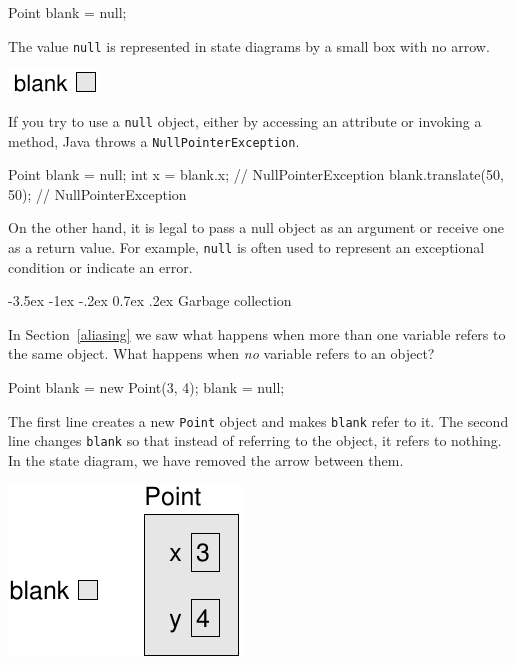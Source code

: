 \documentclass[12pt]{book}
\makeatletter
\theoremstyle{exercise}
\newcommand{\java}[1]{\verb"#1"}
\renewcommand{\section}{\@startsection{section}{1}{\z@}%
    {-3.5ex \@plus -1ex \@minus -.2ex}%
    {0.7ex \@plus.2ex}%
    {\normalfont\Large\bfseries}}
\newcommand{\java}[1]{\lstinline{#1}} %
\makeatother
\begin{document}
\begin{code}
    Point blank = null;
\end{code}

The value \java{null} is represented in state diagrams by a small box with no arrow.

\begin{center}
\includegraphics{figs/reference2.pdf}
\end{center}


If you try to use a \java{null} object, either by accessing an attribute or invoking a method, Java throws a \java{NullPointerException}.

\begin{code}
    Point blank = null;
    int x = blank.x;              // NullPointerException
    blank.translate(50, 50);      // NullPointerException
\end{code}

On the other hand, it is legal to pass a null object as an argument or receive one as a return value.
For example, \java{null} is often used to represent an exceptional condition or indicate an error.


\section{Garbage collection}

In Section~\ref{aliasing} we saw what happens when more than one variable refers to the same object.
What happens when {\em no} variable refers to an object?

\begin{code}
    Point blank = new Point(3, 4);
    blank = null;
\end{code}

The first line creates a new \java{Point} object and makes \java{blank} refer to it.
The second line changes \java{blank} so that instead of referring to the object, it refers to nothing.
In the state diagram, we have removed the arrow between them.

\begin{center}
\includegraphics{figs/reference3.pdf}
\end{center}
\end{document}
